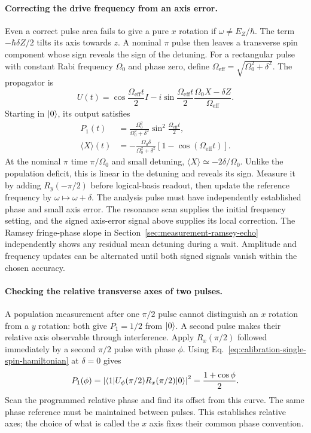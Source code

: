 \paragraph{Correcting the drive frequency from an axis error.}
Even a correct pulse area fails to give a pure $x$ rotation if
$\omega\ne E_Z/\hbar$. The term $-\hbar\delta Z/2$ tilts its axis
towards $z$. A nominal $\pi$ pulse then leaves a transverse spin
component whose sign reveals the sign of the detuning.
For a rectangular pulse with constant Rabi frequency $\Omega_0$
and phase zero, define
$\Omega_{\mathrm{eff}}=\sqrt{\Omega_0^2+\delta^2}$.
The propagator is
\[
 U(t)=\cos\frac{\Omega_{\mathrm{eff}}t}{2}I
 -i\sin\frac{\Omega_{\mathrm{eff}}t}{2}
                 \frac{\Omega_0 X-\delta Z}{\Omega_{\mathrm{eff}}}.
\]
Starting in $\lvert 0\rangle$, its output satisfies
\begin{equation}
 \begin{aligned}
 P_1(t)&=\frac{\Omega_0^2}{\Omega_0^2+\delta^2}
                  \sin^2\frac{\Omega_{\mathrm{eff}}t}{2},\\
 \langle X\rangle(t)&=
  -\frac{\Omega_0\delta}{\Omega_0^2+\delta^2}
                     [1-\cos(\Omega_{\mathrm{eff}}t)].
 \end{aligned}
 \label{eq:calibration-axis-error-signal}
\end{equation}
At the nominal $\pi$ time $\pi/\Omega_0$ and small detuning,
$\langle X\rangle\simeq-2\delta/\Omega_0$. Unlike the population
deficit, this is linear in the detuning and reveals its sign.
Measure it by adding $R_y(-\pi/2)$ before logical-basis readout,
then update the reference frequency by $\omega\mapsto\omega+\delta$.
The analysis pulse must have independently established phase and
small axis error. The resonance scan supplies the initial frequency
setting, and the signed axis-error signal above supplies its local
correction. The Ramsey fringe-phase slope in
Section~\ref{sec:measurement-ramsey-echo} independently shows any
residual mean detuning during a wait. Amplitude and frequency updates
can be alternated until both signed signals vanish within the chosen
accuracy.

\paragraph{Checking the relative transverse axes of two pulses.}
A population measurement after one $\pi/2$ pulse cannot distinguish
an $x$ rotation from a $y$ rotation: both give $P_1=1/2$ from
$\lvert 0\rangle$. A second pulse makes their relative axis observable
through interference.
Apply $R_x(\pi/2)$ followed immediately by a second $\pi/2$ pulse
with phase $\phi$. Using Eq.~\eqref{eq:calibration-single-spin-hamiltonian}
at $\delta=0$ gives
\begin{equation}
 P_1(\phi)
 =\left|\bra1 U_\phi(\pi/2)R_x(\pi/2)\ket0\right|^2
 =\frac{1+\cos\phi}{2}.
 \label{eq:calibration-drive-phase}
\end{equation}
Scan the programmed relative phase and find its offset from this
curve. The same phase reference must be maintained between pulses.
This establishes relative axes; the choice of what is called the
$x$ axis fixes their common phase convention.

